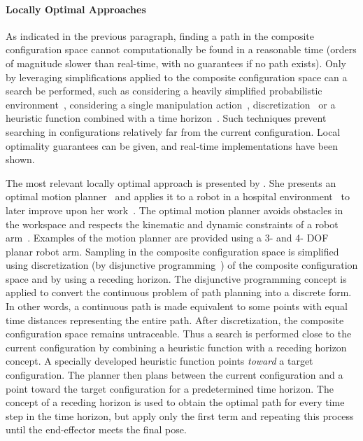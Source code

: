 \paragraph{Locally Optimal Approaches}
As indicated in the previous paragraph, finding a path in the composite configuration space cannot computationally be found in a reasonable time (orders of magnitude slower than real-time, with no guarantees if no path exists). Only by leveraging simplifications applied to the composite configuration space can a search be performed, such as considering a heavily simplified probabilistic environment~\cite{vandenberg_path_2009}, considering a single manipulation action~\cite{berenson_manipulation_2009}, discretization~\cite{sabbaghnovin_optimal_2016} or a heuristic function combined with a time horizon~\cite{sabbaghnovin_optimal_2016}. Such techniques prevent searching in configurations relatively far from the current configuration. Local optimality guarantees can be given, and real-time implementations have been shown.\bs

The most relevant locally optimal approach is presented by \citeauthor{sabbaghnovin_model_2021}. She presents an optimal motion planner~\cite{sabbaghnovin_optimal_2016} and applies it to a robot in a hospital environment~\cite{novin_dynamic_2018} to later improve upon her work~\cite{sabbaghnovin_model_2021}. The optimal motion planner avoids obstacles in the workspace and respects the kinematic and dynamic constraints of a robot arm~\cite{sabbaghnovin_optimal_2016}. Examples of the motion planner are provided using a 3- and 4- \ac{DOF} planar robot arm. Sampling in the composite configuration space is simplified using discretization (by disjunctive programming~\cite{_disjunctive_2018}) of the composite configuration space and by using a receding horizon. The disjunctive programming concept is applied to convert the continuous problem of path planning into a discrete form. In other words, a continuous path is made equivalent to some points with equal time distances representing the entire path. After discretization, the composite configuration space remains untraceable. Thus a search is performed close to the current configuration by combining a heuristic function with a receding horizon concept. A specially developed heuristic function points \textit{toward} a target configuration. The planner then plans between the current configuration and a point toward the target configuration for a predetermined time horizon. The concept of a receding horizon is used to obtain the optimal path for every time step in the time horizon, but apply only the first term and repeating this process until the end-effector meets the final pose.\bs

